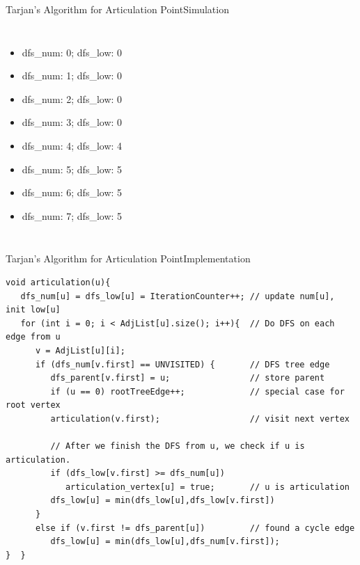 \begin{frame}{Tarjan's Algorithm for Articulation Point}{Simulation}
  \begin{columns}
    \begin{itemize}
      \item dfs\_num: 0; dfs\_low: 0
      \item<2-> dfs\_num: 1; dfs\_low: 0
      \item<3-> dfs\_num: 2; dfs\_low: 0
      \item<4-> dfs\_num: 3; dfs\_low: 0
      \item<5-> dfs\_num: 4; dfs\_low: 4
      \item<6-> dfs\_num: 5; dfs\_low: 5
      \item<7-> dfs\_num: 6; dfs\_low: 5
      \item<8-> dfs\_num: 7; dfs\_low: 5
    \end{itemize}
  \end{columns}
\end{frame}

\begin{frame}[fragile]{Tarjan's Algorithm for Articulation Point}{Implementation}
{\smaller
  \begin{exampleblock}{}
\begin{verbatim}
void articulation(u){
   dfs_num[u] = dfs_low[u] = IterationCounter++; // update num[u], init low[u]
   for (int i = 0; i < AdjList[u].size(); i++){  // Do DFS on each edge from u
      v = AdjList[u][i];
      if (dfs_num[v.first] == UNVISITED) {       // DFS tree edge
         dfs_parent[v.first] = u;                // store parent
         if (u == 0) rootTreeEdge++;             // special case for root vertex
         articulation(v.first);                  // visit next vertex

         // After we finish the DFS from u, we check if u is articulation.
         if (dfs_low[v.first] >= dfs_num[u])
            articulation_vertex[u] = true;       // u is articulation
         dfs_low[u] = min(dfs_low[u],dfs_low[v.first])
      }
      else if (v.first != dfs_parent[u])         // found a cycle edge
         dfs_low[u] = min(dfs_low[u],dfs_num[v.first]);
}  }
\end{verbatim}
  \end{exampleblock}}
\end{frame}

